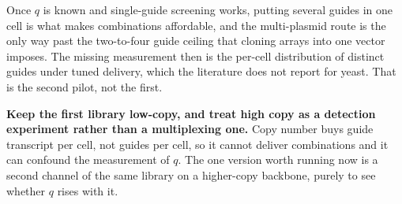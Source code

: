 Once $q$ is known and
single-guide screening works, putting several guides in one cell is what makes
combinations affordable, and the multi-plasmid route is the only way past the
two-to-four guide ceiling that cloning arrays into one vector imposes. The
missing measurement then is the per-cell distribution of distinct guides under
tuned delivery, which the literature does not report for yeast. That is the
second pilot, not the first.

\begin{keybox}
\textbf{Keep the first library low-copy, and treat high copy as a detection
experiment rather than a multiplexing one.} Copy number buys guide transcript
per cell, not guides per cell, so it cannot deliver combinations and it can
confound the measurement of $q$. The one version worth running now is a second
channel of the same library on a higher-copy backbone, purely to see whether $q$
rises with it.
\end{keybox}
